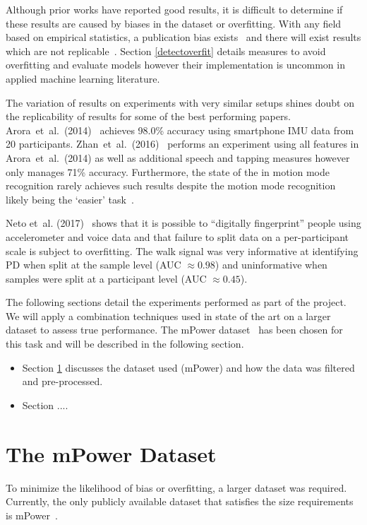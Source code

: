 \documentclass[12pt, twoside]{book}
\begin{document}
Although prior works have reported good results, it is difficult to determine if these results are caused by biases in the dataset or overfitting. With any field based on empirical statistics, a publication bias exists~\cite{publicationbias} and there will exist results which are not replicable~\cite{replicability}. Section \ref{detectoverfit} details measures to avoid overfitting and evaluate models however their implementation is uncommon in applied machine learning literature. 

The variation of results on experiments with very similar setups shines doubt on the replicability of results for some of the best performing papers. Arora~et~al.~(2014)~\cite{arora2014high} achieves 98.0\% accuracy using smartphone IMU data from 20 participants. Zhan~et~al.~(2016)~\cite{zhan2016high} performs an experiment using all features in Arora~et~al.~(2014) as well as additional speech and tapping measures however only manages 71\% accuracy. Furthermore, the state of the in motion mode recognition rarely achieves such results despite the motion mode recognition likely being the `easier' task~\cite{motionmoderecognition}. 

Neto et~al. (2017)~\cite{mpowerneto2017analysis} shows that it is possible to ``digitally fingerprint'' people using accelerometer and voice data and that failure to split data on a per-participant scale is subject to overfitting. The walk signal was very informative at identifying PD when split at the sample level (AUC $\approx 0.98$) and uninformative when samples were split at a participant level (AUC $\approx 0.45$). 
 
The following sections detail the experiments performed as part of the project. We will apply a combination techniques used in state of the art on a larger dataset to assess true performance. The mPower dataset~\cite{mpower} has been chosen for this  task and will be described in the following section.

\begin{itemize}
\item Section \ref{mpower} discusses the dataset used (mPower) and how the data was filtered and pre-processed.
\item Section ....
\end{itemize}

\section{The mPower Dataset}
\label{mpower}
To minimize the likelihood of bias or overfitting, a larger dataset was required. Currently, the only publicly available dataset that satisfies the size requirements is mPower~\cite{mpower}. 
\end{document}
